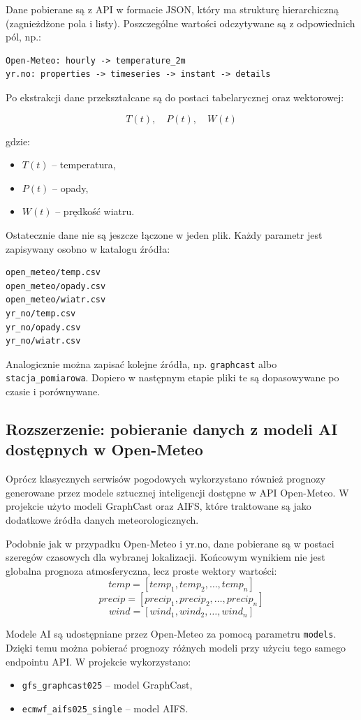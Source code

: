 \documentclass[a4paper,12pt]{article}
\begin{document}
\noindent
Dane pobierane są z API w formacie JSON, który ma strukturę
hierarchiczną (zagnieżdżone pola i listy). Poszczególne wartości
odczytywane są z odpowiednich pól, np.:

\begin{verbatim}
Open-Meteo: hourly -> temperature_2m
yr.no: properties -> timeseries -> instant -> details
\end{verbatim}

\noindent
Po ekstrakcji dane przekształcane są do postaci tabelarycznej
oraz wektorowej:

\[
T(t), \quad P(t), \quad W(t)
\]

\noindent
gdzie:
\begin{itemize}
    \item $T(t)$ – temperatura,
    \item $P(t)$ – opady,
    \item $W(t)$ – prędkość wiatru.
\end{itemize}

\noindent
Ostatecznie dane nie są jeszcze łączone w jeden plik. Każdy parametr jest
zapisywany osobno w katalogu źródła:
\begin{verbatim}
open_meteo/temp.csv
open_meteo/opady.csv
open_meteo/wiatr.csv
yr_no/temp.csv
yr_no/opady.csv
yr_no/wiatr.csv
\end{verbatim}
Analogicznie można zapisać kolejne źródła, np. \texttt{graphcast}
albo \texttt{stacja\_pomiarowa}. Dopiero w następnym
etapie pliki te są dopasowywane po czasie i porównywane.


\subsection{Rozszerzenie: pobieranie danych z modeli AI dostępnych w Open-Meteo}

Oprócz klasycznych serwisów pogodowych wykorzystano również prognozy
generowane przez modele sztucznej inteligencji dostępne w API Open-Meteo.
W projekcie użyto modeli GraphCast oraz AIFS, które traktowane są jako
dodatkowe źródła danych meteorologicznych.

\noindent
Podobnie jak w przypadku Open-Meteo i yr.no, dane pobierane są w postaci
szeregów czasowych dla wybranej lokalizacji. Końcowym wynikiem nie jest
globalna prognoza atmosferyczna, lecz proste wektory wartości:
\[
temp = [temp_1, temp_2, \dots, temp_n]
\]
\[
precip = [precip_1, precip_2, \dots, precip_n]
\]
\[
wind = [wind_1, wind_2, \dots, wind_n]
\]

\noindent
Modele AI są udostępniane przez Open-Meteo za pomocą parametru
\texttt{models}. Dzięki temu można pobierać prognozy różnych modeli przy
użyciu tego samego endpointu API. W projekcie wykorzystano:
\begin{itemize}
    \item \texttt{gfs\_graphcast025} -- model GraphCast,
    \item \texttt{ecmwf\_aifs025\_single} -- model AIFS.
\end{itemize}
\end{document}

